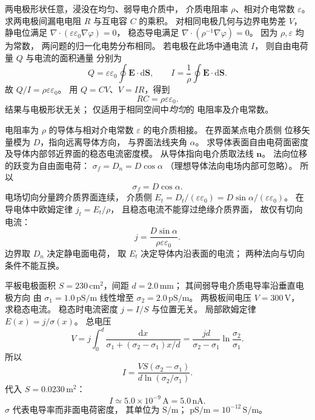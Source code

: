 两电极形状任意，浸没在均匀、弱导电介质中，
介质电阻率 $\rho$、相对介电常数 $\varepsilon$。
求两电极间漏电电阻 $R$ 与互电容 $C$ 的乘积。
\exsolution
对相同电极几何与边界电势差 $V$，
静电位满足 $\nabla\cdot(\varepsilon\varepsilon_0
\nabla\varphi)=0$，
稳态导电满足
$\nabla\cdot(\rho^{-1}\nabla\varphi)=0$。
因为 $\rho,\varepsilon$ 均为常数，
两问题的归一化电势分布相同。
若电极在此场中通电流 $I$，
则自由电荷量 $Q$ 与电流的面积通量
分别为
\[
Q=\varepsilon\varepsilon_0\oint\bm E\cdot\mathrm d\bm S,
\qquad
I=\frac1\rho\oint\bm E\cdot\mathrm d\bm S.
\]
故 $Q/I=\rho\varepsilon\varepsilon_0$。
用 $Q=CV$、$V=IR$，得到
\[
\boxed{RC=\rho\varepsilon\varepsilon_0}.
\]
\excheck 结果与电极形状无关；
仅适用于相同空间中\emph{均匀}的
电阻率及介电常数。

电阻率为 $\rho$ 的导体与相对介电常数
$\varepsilon$ 的电介质相接。
在界面某点电介质侧
位移矢量模为 $D$，指向远离导体方向，
与界面法线夹角 $\alpha$。
求导体表面自由电荷面密度
及导体内部邻近界面的稳态电流密度模。
\exsolution
从导体指向电介质取法线 $\bm n$。
法向位移的跃变为自由面电荷：
$\sigma_f=D_n=D\cos\alpha$
（理想导体法向电场内部可忽略）。
所以
\[
\boxed{\sigma_f=D\cos\alpha}.
\]
电场切向分量跨介质界面连续，
介质侧
$E_t=D_t/(\varepsilon\varepsilon_0)
=D\sin\alpha/(\varepsilon\varepsilon_0)$。
在导电体中欧姆定律
$j_t=E_t/\rho$，
且稳态电流不能穿过绝缘介质界面，
故仅有切向电流：
\[
\boxed{j=\frac{D\sin\alpha}
{\rho\varepsilon\varepsilon_0}}.
\]
\excheck 边界取 $D_n$ 决定静电面电荷，
取 $E_t$ 决定导体内沿表面的电流；
两种法向与切向条件不能互换。

平板电极面积
$S=230\,\mathrm{cm^2}$，间距
$d=2.0\,\mathrm{mm}$；
其间弱导电介质电导率沿垂直电极方向
由 $\sigma_1=1.0\,\mathrm{pS/m}$
线性增至 $\sigma_2=2.0\,\mathrm{pS/m}$。
两极板间电压 $V=300\,\mathrm V$，
求稳态电流。
\exsolution
稳态时电流密度
$j=I/S$ 与位置无关。
局部欧姆定律
$E(x)=j/\sigma(x)$。
总电压
\[
V=j\int_0^d\frac{\mathrm dx}{\sigma_1+
(\sigma_2-\sigma_1)x/d}
=\frac{jd}{\sigma_2-\sigma_1}
\ln\frac{\sigma_2}{\sigma_1}.
\]
所以
\[
\boxed{I=\frac{VS(\sigma_2-\sigma_1)}
{d\ln(\sigma_2/\sigma_1)}}.
\]
代入 $S=0.0230\,\mathrm{m^2}$：
\[
\boxed{I\simeq5.0\times10^{-9}\,\mathrm A
=5.0\,\mathrm{nA}}.
\]
\excheck $\sigma$ 代表电导率而非面电荷密度，
其单位为 $\mathrm{S/m}$；
$\mathrm{pS/m}=10^{-12}\,\mathrm{S/m}$。

